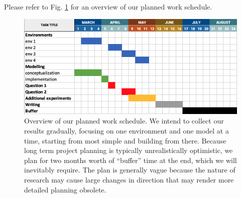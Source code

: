 \documentclass[../main.tex]{subfiles}
\begin{document}
Please refer to Fig. \ref{fig:planning} for an overview of our planned work schedule.

\begin{figure}[h]
\centering
\includegraphics[width=\textwidth]{images/plan}
\caption{Overview of our planned work schedule. We intend to collect our results gradually, focusing
	on one environment and one model at a time, starting from most simple and building from there.
	Because long term project planning is typically unrealistically optimistic, we plan for two months
	worth of ``buffer'' time at the end, which we will inevitably require. The plan is generally vague
because the nature of research may cause large changes in direction that may render more detailed
planning obsolete.}
\label{fig:planning}
\end{figure}


\ifSubfilesClassLoaded{%
	
}{}
\end{document}
